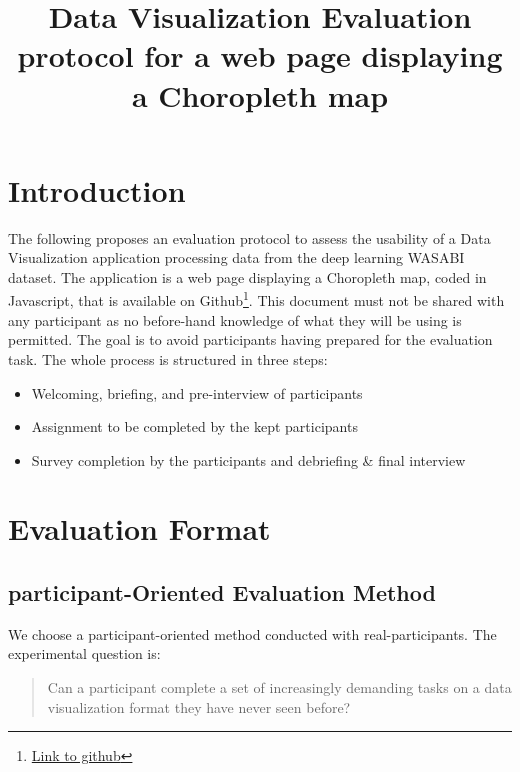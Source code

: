 \documentclass[twocolumn, letterpaper,13pt]{scrartcl}
\begin{document}
    \title{\color{seablue}Data Visualization Evaluation protocol for a web page displaying a Choropleth map}

	\maketitle
	
    \section*{Introduction}
    
    The following proposes an evaluation protocol to assess the usability of a Data Visualization application processing data from the deep learning WASABI dataset.
    \newline
    The application is a web page displaying a Choropleth map, coded in Javascript, that is available on Github\footnote{\href{https://github.com/LMquentinLR/choropleth\_wasabi\_dataset}{Link to github}}.
    \newline
    This document must not be shared with any participant as no before-hand knowledge of what they will be using is permitted. The goal is to avoid participants having prepared for the evaluation task.
    \newline
    \newline
    The whole process is structured in three steps:
    \begin{itemize}
        \item Welcoming, briefing, and pre-interview of participants
        \item Assignment to be completed by the kept participants
        \item Survey completion by the participants and debriefing \& final interview
    \end{itemize}
    
    \section*{Evaluation Format}

    \subsection*{participant-Oriented Evaluation Method}
    
    We choose a participant-oriented method conducted with real-participants. The experimental question is: 
    
    \begin{quote}
        Can a participant complete a set of increasingly demanding tasks on a data visualization format they have never seen before?
    \end{quote}
    
\end{document}
